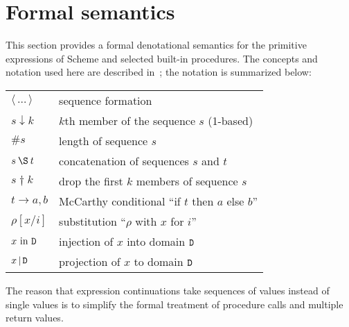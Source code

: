 \section{Formal semantics}
\label{formalsemanticssection}

\bgroup

\newcommand{\sembrack}[1]{[\![#1]\!]}
\newcommand{\fun}[1]{\hbox{\it #1}}
\newenvironment{semfun}{\begin{tabbing}$}{$\end{tabbing}}
\newcommand\LOC{{\tt{}L}}
\newcommand\NAT{{\tt{}N}}
\newcommand\TRU{{\tt{}T}}
\newcommand\SYM{{\tt{}Q}}
\newcommand\CHR{{\tt{}H}}
\newcommand\NUM{{\tt{}R}}
\newcommand\FUN{{\tt{}F}}
\newcommand\EXP{{\tt{}E}}
\newcommand\STV{{\tt{}E}}
\newcommand\STO{{\tt{}S}}
\newcommand\ENV{{\tt{}U}}
\newcommand\ANS{{\tt{}A}}
\newcommand\ERR{{\tt{}X}}
\newcommand\EC{{\tt{}K}}
\newcommand\CC{{\tt{}C}}
\newcommand\MSC{{\tt{}M}}
\newcommand\PAI{\hbox{\EXP$_{\rm p}$}}
\newcommand\VEC{\hbox{\EXP$_{\rm v}$}}
\newcommand\STR{\hbox{\EXP$_{\rm s}$}}

\newcommand\elt{\downarrow}
\newcommand\drop{\dagger}

This section provides a formal denotational semantics for the primitive
expressions of Scheme and selected built-in procedures.  The concepts
and notation used here are described in~\cite{Stoy77}; the notation is
summarized below:

\begin{tabular}{ll}
$\langle\,\ldots\,\rangle$ & sequence formation \\
$s \elt k$	           & $k$th member of the sequence $s$ (1-based) \\
$\#s$			   & length of sequence $s$ \\
$s \:\S\: t$	           & concatenation of sequences $s$ and $t$ \\
$s \drop k$                & drop the first $k$ members of sequence $s$ \\
$t \rightarrow a, b$       & McCarthy conditional ``if $t$ then $a$ else $b$'' \\
$\rho[x/i]$	           & substitution ``$\rho$ with $x$ for $i$'' \\
$x\hbox{ \rm in }{\tt{}D}$         & injection of $x$ into domain ${\tt{}D}$ \\
$x\,\vert\,{\tt{}D}$	   & projection of $x$ to domain ${\tt{}D}$
\end{tabular}

The reason that expression continuations take sequences of values instead
of single values is to simplify the formal treatment of procedure calls
and multiple return values.

